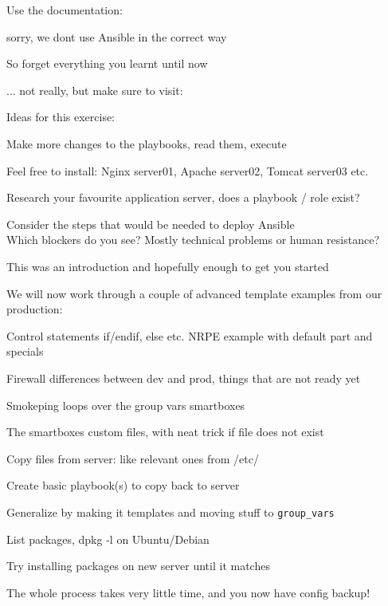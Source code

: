 \documentclass[18pt,landscape,a4paper,footrule]{foils}
\begin{document}
Use the documentation:\\



sorry, we dont use Ansible in the correct way

So forget everything you learnt until now \smiley

... not really, but make sure to visit:\\



Ideas for this exercise:
\begin{list2}
\item Make more changes to the playbooks, read them, execute
\item Feel free to install: Nginx server01, Apache server02, Tomcat server03 etc.
\item Research your favourite application server, does a playbook / role exist?
\item Consider the steps that would be needed to deploy Ansible\\
Which blockers do you see? Mostly technical problems or human resistance?
\end{list2}

\centerline{This was an introduction and hopefully enough to get you started}


We will now work through a couple of advanced template examples from our production:
\begin{list2}
\item Control statements if/endif, else etc. NRPE example with default part and specials
\item Firewall differences between dev and prod, things that are not ready yet
\item Smokeping loops over the group vars smartboxes
\item The smartboxes custom files, with neat trick if file does not exist
\end{list2}


\begin{list2}
\item Copy files from server: like relevant ones from /etc/
\item Create basic playbook(s) to copy back to server
\item Generalize by making it templates and moving stuff to \verb+group_vars+
\item List packages, dpkg -l on Ubuntu/Debian
\item Try installing packages on new server until it matches
\item The whole process takes very little time, and you now have config backup!
\end{list2}
\end{document}
